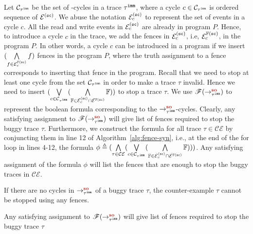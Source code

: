 Let $ \mathcal{C}_{{\tau}^{\mathtt{imm}}} $ be the set of \lso-cycles in a trace $ {\tau}^{\mathtt{imm}} $, 
where a cycle $ c \in \mathcal{C}_{{\tau}^{\mathtt{imm}}} $ is ordered sequence of 
$ \mathcal{E}^{(\texttt{sc})} $. We abuse the notation $\mathcal{E}^{(\texttt{sc})}_c$ to 
represent the set of events in a cycle $ c $. 
All the read and write events in $\mathcal{E}^{(\texttt{sc})}_c$ are already in program $ P $. 
Hence, to introduce a cycle $ c $ in the trace, we add the fences in $\mathcal{E}^{(\texttt{sc})}_c$, i.e, 
$\mathcal{E}^{\mathbb{F}(\texttt{sc})}_c$, in the program $ P $.
In other words, a cycle $ c $ can be introduced in a program if we insert 
$ (\bigwedge\limits_{f \in \mathcal{E}^{\mathbb{F}(\texttt{sc})}_c} f)$ fences in the program $ P $, 
where the truth assignment to a fence corresponds to inserting that fence 
in the program.
Recall that we need to stop at least one cycle from the set 
$ \mathcal{C}_{{\tau}^{\mathtt{imm}}} $ in order to make a trace $ \tau $ invalid.
Hence we need to insert $ (\bigvee\limits_{c \in \mathcal{C}_{{\tau}^{\mathtt{imm}}}} (\bigwedge\limits_{{\mathbb{F}} \in \mathcal{E}^{(\texttt{sc})}_c \cap 
\mathcal{E}^{\mathbb{F}(\texttt{sc})}} {\mathbb{F}})) $ to stop a trace $ \tau $. 
We use $\formula{\so{\imm{\tau}}{}{}}$ to represent the boolean formula 
corresponding to the $ \so{\imm{\tau}}{}{} $-cycles.
Clearly, any satisfying assignment to $ \formula{\so{\imm{\tau}}{}{}} $ 
will give list of fences required to stop the buggy trace $ \tau $.
%
Furthermore, we construct the formula for all trace 
$ \tau \in \mathcal{CE} $ by conjuncting them in 
line 12 of Algorithm~\ref{alg:fence-syn}, i.e., 
at the end of the for loop in lines 4-12, the formula 
$ \phi \triangleq (\bigwedge\limits_{\tau \in \mathcal{CE}} 
(\bigvee\limits_{c \in \mathcal{C}_{{\tau}^{\mathtt{imm}}}} 
(\bigwedge\limits_{{\mathbb{F}} \in \mathcal{E}^{(\texttt{sc})}_c \cap \mathcal{E}^{\mathbb{F}(\texttt{sc})}} {\mathbb{F}}))) $.
Any satisfying assignment of the formula $\phi$ will list the fences that 
are enough to stop the buggy traces in $ \mathcal{CE} $.


\begin{lemma}
	If there are no cycles in $\so{\imm{\tau}}{}{}$ of a buggy trace 
	$\tau$, the counter-example $ \tau $ cannot be stopped using any \cc 
	fences.
\end{lemma}

\begin{theorem}
	Any satisfying assignment to $ \formula{\so{\imm{\tau}}{}{}} $ 
	will give list of fences required to stop the buggy trace $ \tau $
\end{theorem}


